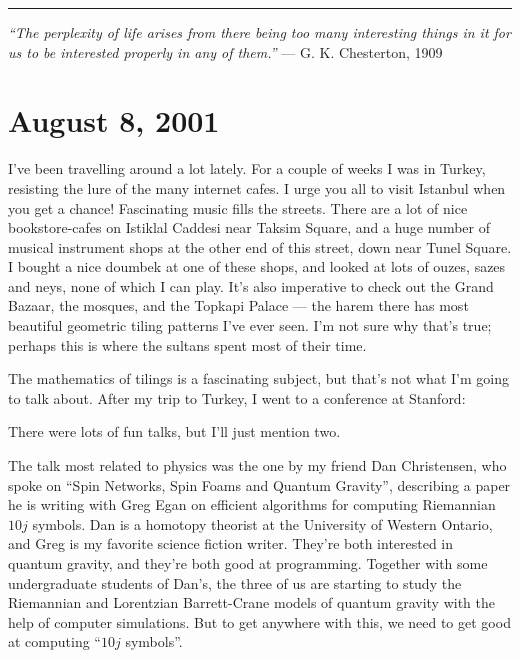\documentclass{article}
\def\tightlist{}
\renewcommand{\texttt}[1]{%
  \begingroup
  \ttfamily
  \begingroup\lccode`~=`/\lowercase{\endgroup\def~}{/\discretionary{}{}{}}%
  \begingroup\lccode`~=`[\lowercase{\endgroup\def~}{[\discretionary{}{}{}}%
  \begingroup\lccode`~=`.\lowercase{\endgroup\def~}{.\discretionary{}{}{}}%
  \catcode`/=\active\catcode`[=\active\catcode`.=\active
  \scantokens{#1\noexpand}%
  \endgroup
}
\begin{document}
\begin{center}\rule{0.5\linewidth}{0.5pt}\end{center}

\emph{``The perplexity of life arises from there being too many
interesting things in it for us to be interested properly in any of
them.''} --- G. K. Chesterton, 1909



\hypertarget{week170}{%
\section{August 8, 2001}\label{week170}}

I've been travelling around a lot lately. For a couple of weeks I was in
Turkey, resisting the lure of the many internet cafes. I urge you all to
visit Istanbul when you get a chance! Fascinating music fills the
streets. There are a lot of nice bookstore-cafes on Istiklal Caddesi
near Taksim Square, and a huge number of musical instrument shops at the
other end of this street, down near Tunel Square. I bought a nice
doumbek at one of these shops, and looked at lots of ouzes, sazes and
neys, none of which I can play. It's also imperative to check out the
Grand Bazaar, the mosques, and the Topkapi Palace --- the harem there
has most beautiful geometric tiling patterns I've ever seen. I'm not
sure why that's true; perhaps this is where the sultans spent most of
their time.

The mathematics of tilings is a fascinating subject, but that's not what
I'm going to talk about. After my trip to Turkey, I went to a conference
at Stanford:


There were lots of fun talks, but I'll just mention two.

The talk most related to physics was the one by my friend Dan
Christensen, who spoke on ``Spin Networks, Spin Foams and Quantum
Gravity'', describing a paper he is writing with Greg Egan on efficient
algorithms for computing Riemannian \(10j\) symbols. Dan is a homotopy
theorist at the University of Western Ontario, and Greg is my favorite
science fiction writer. They're both interested in quantum gravity, and
they're both good at programming. Together with some undergraduate
students of Dan's, the three of us are starting to study the Riemannian
and Lorentzian Barrett-Crane models of quantum gravity with the help of
computer simulations. But to get anywhere with this, we need to get good
at computing ``\(10j\) symbols''.
\end{document}
